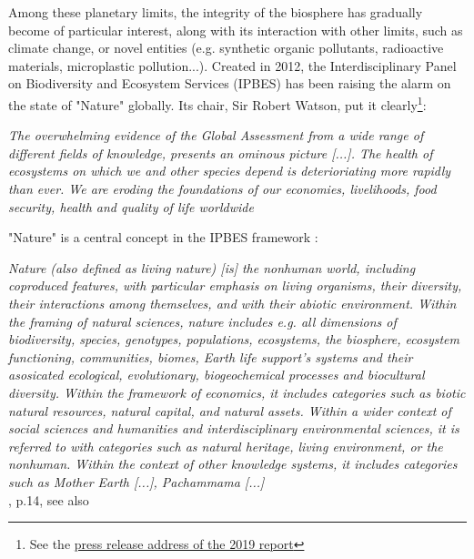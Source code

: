 Among these planetary limits, the integrity of the biosphere has gradually become of particular interest, along with its interaction with other limits, such as climate change, or novel entities (e.g. synthetic organic pollutants, radioactive materials, microplastic pollution...). Created in 2012, the Interdisciplinary Panel on Biodiversity and Ecosystem Services (IPBES) has been raising the alarm on the state of "Nature" globally. Its chair, Sir Robert Watson, put it clearly\footnote{See the \href{https://www.ipbes.net/news/Media-Release-Global-Assessment}{press release address of the 2019 report}}:
\begin{displayquote}
\textit{The overwhelming evidence of the \cite{ipbes_2022_6417333} Global Assessment from a wide range of different fields of knowledge, presents an ominous picture [...]. The health of ecosystems on which we and other species depend is deterioriating more rapidly than ever. We are eroding the foundations of our economies, livelihoods, food security, health and quality of life worldwide}
\end{displayquote}

"Nature" is a central concept in the IPBES framework \citep{ipbes_2022_6417333}:

\begin{displayquote}
\textit{Nature (also defined as living nature) [is] the nonhuman world, including coproduced features, with particular emphasis on living organisms, their diversity, their interactions among themselves, and with their abiotic environment. Within the framing of natural sciences, nature includes e.g. all dimensions of biodiversity, species, genotypes, populations, ecosystems, the biosphere, ecosystem functioning, communities, biomes, Earth life support's systems and their asosicated ecological, evolutionary, biogeochemical processes and biocultural diversity. Within the framework of economics, it includes categories such as biotic natural resources, natural capital, and natural assets. Within a wider context of social sciences and humanities and interdisciplinary environmental sciences, it is referred to with categories such as natural heritage, living environment, or the nonhuman. Within the context of other knowledge systems, it includes categories such as Mother Earth [...], Pachammama [...]}\\
\hspace*{\fill} \small{\cite{ipbes_2022_6417333}, p.14, see also \cite{DIAZ20151}}
\end{displayquote}

